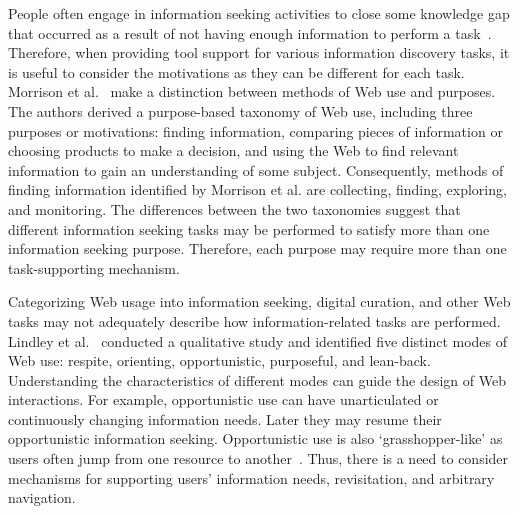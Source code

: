 \documentclass[review]{elsarticle}
\begin{document}
People often engage in information seeking activities to close some knowledge gap that occurred as a result of not having enough information to perform a task~\cite{proper1999information}. Therefore, when providing tool support for various information discovery tasks, it is useful to consider the motivations as they can be different for each task. Morrison et al.~\cite{morrison2001taxonomic} make a distinction between methods of Web use and purposes. The authors derived a purpose-based taxonomy of Web use, including three purposes or motivations: finding information, comparing pieces of information or choosing products to make a decision, and using the Web to find relevant information to gain an understanding of some subject. Consequently, methods of finding information identified by Morrison et al. are collecting, finding, exploring, and monitoring. The differences between the two taxonomies suggest that different information seeking tasks may be performed to satisfy more than one information seeking purpose. Therefore, each purpose may require more than one task-supporting mechanism. 

Categorizing Web usage into information seeking, digital curation, and other Web tasks may not adequately describe how information-related tasks are performed. Lindley et al.~\cite{lindley2012s} conducted a qualitative study and
identified five distinct modes of Web use: respite, orienting, opportunistic, purposeful, and lean-back. 
Understanding the characteristics of different modes can guide the design of Web interactions. For example, opportunistic use can have unarticulated or continuously changing information needs. 
Later they may resume their opportunistic information seeking.  Opportunistic use is also `grasshopper-like' as users often jump from one resource to another~\cite{lindley2012s}.
Thus, there is a need to consider mechanisms for supporting users' information needs, revisitation, and arbitrary navigation.
\end{document}
